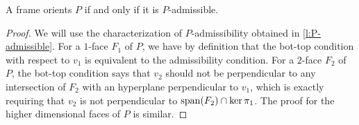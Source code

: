 \begin{lemma} \label{l:bot-top-admissible}
	A frame orients $P$ if and only if it is $P$-admissible.
\end{lemma}

\begin{proof}
	We will use the characterization of $P$-admissibility obtained in \cref{l:P-admissible}.
	For a $1$-face $F_1$ of $P$, we have by definition that the bot-top condition with respect to $v_1$ is equivalent to the admissibility condition.
	For a $2$-face $F_2$ of $P$, the bot-top condition says that $v_2$ should not be perpendicular to any intersection of $F_2$ with an hyperplane perpendicular to $v_1$, which is exactly requiring that $v_2$ is not perpendicular to $\operatorname{\mathrm{span}}(F_2)\cap \ker \pi_1$.
	The proof for the higher dimensional faces of $P$ is similar.
\end{proof}

